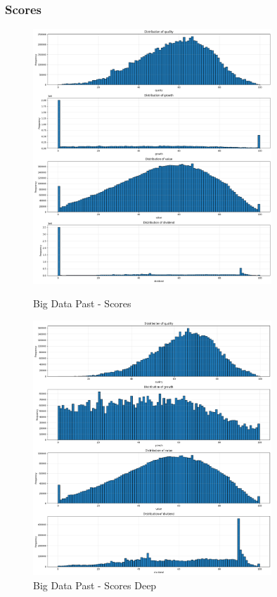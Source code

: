 \documentclass[11pt,english,a4paper,hidelinks]{book}
\begin{document}
\subsubsection{Scores}
\begin{figure}[H]
    \centering
    \begin{minipage}{0.48\textwidth}
        \centering
        \includegraphics[width=0.8\textwidth]{images/code/descriptive analysis/distributions/Big Data past - Scores.png}
    \caption{Big Data Past - Scores}
    \label{fig:past_scores}
    \end{minipage}\hfill
    \begin{minipage}{0.48\textwidth}
        \centering
        \includegraphics[width=0.8\textwidth]{images/code/descriptive analysis/distributions/Big Data past - Scores Deep.png}
        \caption{Big Data Past - Scores Deep}
        \label{fig:past_scores_deep}
    \end{minipage}
\end{figure}
\end{document}
